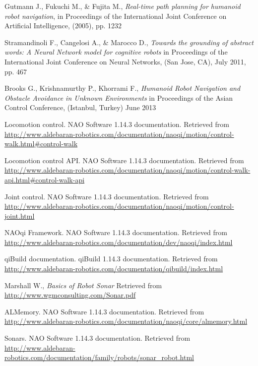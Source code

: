 \begin{thebibliography}{99}
    Gutmann J., Fukuchi M., \& Fujita M.,
    \emph{Real-time path planning for humanoid robot navigation},
    in Proceedings of the International Joint Conference on Artificial Intelligence,
    (2005),
    pp. 1232

	Stramandinoli F., Cangelosi A., \& Marocco D.,
	\emph{Towards the grounding of abstract words: A Neural Network model for cognitive robots}
	in Proceedings of the International Joint Conference on Neural Networks,
	(San Jose, CA),
	July 2011,
	pp. 467

	Brooks G., Krishnamurthy P., Khorrami F.,
	\emph{Humanoid Robot Navigation and Obstacle Avoidance in Unknown Environments}
	in Proceedings of the Asian Control Conference,
	(Istanbul, Turkey)
	June 2013

   	Locomotion control. 
   	NAO Software 1.14.3 documentation. 
   	Retrieved from \url{http://www.aldebaran-robotics.com/documentation/naoqi/motion/control-walk.html#control-walk}

	Locomotion control API.
	NAO Software 1.14.3 documentation.
	Retrieved from \url{http://www.aldebaran-robotics.com/documentation/naoqi/motion/control-walk-api.html#control-walk-api}

	Joint control.
	NAO Software 1.14.3 documentation.
	Retrieved from \url{http://www.aldebaran-robotics.com/documentation/naoqi/motion/control-joint.html}

	NAOqi Framework.
	NAO Software 1.14.3 documentation.
	Retrieved from \url{http://www.aldebaran-robotics.com/documentation/dev/naoqi/index.html}

	qiBuild documentation.
	qiBuild 1.14.3 documentation.
	Retrieved from \url{http://www.aldebaran-robotics.com/documentation/qibuild/index.html}

	Marshall W.,
	\emph{Basics of Robot Sonar}
	Retrieved from \url{http://www.wgmconsulting.com/Sonar.pdf}

	ALMemory. 
   	NAO Software 1.14.3 documentation. 
	Retrieved from \url{http://www.aldebaran-robotics.com/documentation/naoqi/core/almemory.html}

	Sonars.
	NAO Software 1.14.3 documentation. 
	Retrieved from \url{http://www.aldebaran-robotics.com/documentation/family/robots/sonar_robot.html}


\end{thebibliography}
